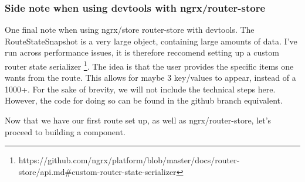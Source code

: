 \subsubsection{ Side note when using devtools with ngrx/router-store }

One final note when using ngrx/store router-store with devtools. The
RouteStateSnapshot is a very large object, containing large amounts of data. I've
run across performance issues, it is therefore reccomend setting up a
custom router state serializer
\footnote{https://github.com/ngrx/platform/blob/master/docs/router-store/api.md\#custom-router-state-serializer}.
The idea is that the user provides the specific items one wants from the route.
This allows for maybe 3 key/values to appear, instead of a 1000+. For the sake of
brevity, we will not include the technical steps here. However, the code for doing
so can be found in the github branch equivalent.

Now that we have our first route set up, as well as ngrx/router-store, let's proceed
to building a component.
